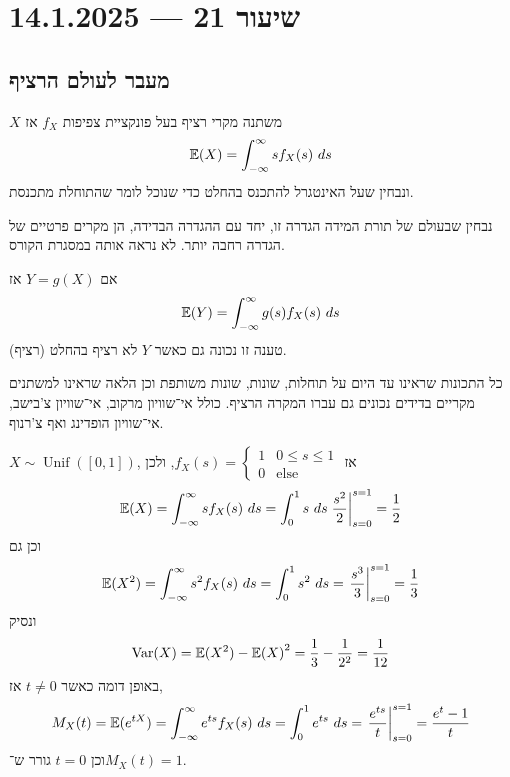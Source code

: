 \section{שיעור 21 --- 14.1.2025}
\subsection{מעבר לעולם הרציף}
\begin{definition}
	$X$ משתנה מקרי רציף בעל פונקציית צפיפות $f_X$ אז
	\[
		\mathbb{E}(X)
		= \int_{-\infty}^{\infty} s f_X(s)\ ds
	\]
	ונבחין שעל האינטגרל להתכנס בהחלט כדי שנוכל לומר שהתוחלת מתכנסת.
\end{definition}
נבחין שבעולם של תורת המידה הגדרה זו, יחד עם ההגדרה הבדידה, הן מקרים פרטיים של הגדרה רחבה יותר. לא נראה אותה במסגרת הקורס.
\begin{proposition}
	אם $Y = g(X)$ אז
	\[
		\mathbb{E}(Y)
		= \int_{-\infty}^{\infty} g(s) f_X(s)\ ds
	\]
	טענה זו נכונה גם כאשר $Y$ לא רציף בהחלט (רציף).
\end{proposition}
כל התכונות שראינו עד היום על תוחלות, שונות, שונות משותפת וכן הלאה שראינו למשתנים מקריים בדידים נכונים גם עברו המקרה הרציף.
כולל אי־שוויון מרקוב, אי־שוויון צ'בישב, אי־שוויון הופדינג ואף צ'רנוף.
\begin{example}
	$X \sim \operatorname{Unif}([0, 1])$, אז $f_X(s) = \begin{cases}
		1 & 0 \le s \le 1 \\
		0 & \text{else}
	\end{cases}$, ולכן
	\[
		\mathbb{E}(X)
		= \int_{-\infty}^{\infty} s f_X(s)\ ds
		= \int_0^1 s\ ds
		\left. \frac{s^2}{2} \right\rvert_{s = 0}^{s = 1}
		= \frac{1}{2}
	\]
	וכן גם
	\[
		\mathbb{E}(X^2)
		= \int_{-\infty}^{\infty} s^2 f_X(s)\ ds
		= \int_0^1 s^2\ ds
		= \left. \frac{s^3}{3} \right\rvert_{s = 0}^{s = 1}
		= \frac{1}{3}
	\]
	ונסיק
	\[
		\operatorname{Var}(X)
		= \mathbb{E}(X^2) - {\mathbb{E}(X)}^2
		= \frac{1}{3} - \frac{1}{2^2}
		= \frac{1}{12}
	\]
	באופן דומה כאשר $t \ne 0$ אז,
	\[
		M_X(t)
		= \mathbb{E}(e^{tX})
		= \int_{-\infty}^{\infty} e^{ts} f_X(s)\ ds
		= \int_0^1 e^{ts}\ ds
		= \left. \frac{e^{ts}}{t} \right\rvert_{s = 0}^{s = 1}
		= \frac{e^t - 1}{t}
	\]
	וכן $t = 0$ גורר ש־$M_X(t) = 1$.
\end{example}

